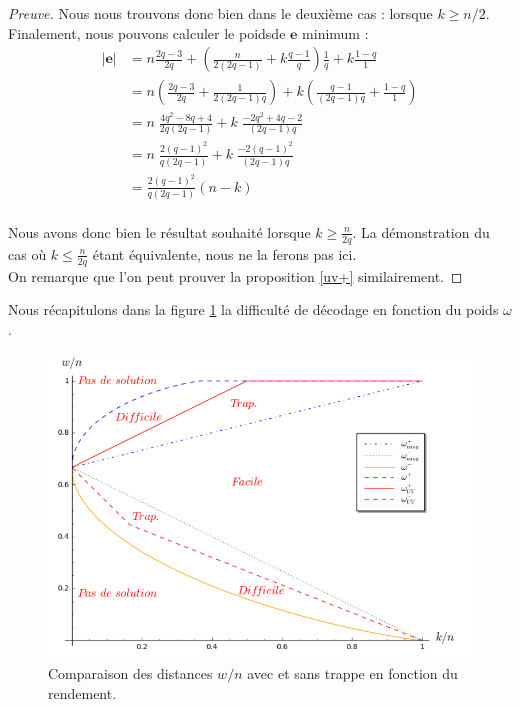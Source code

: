 \documentclass[12pt]{article}
\theoremstyle{plain}
\theoremstyle{definition}
\newcommand{\e}{\mathbf{e}}
\begin{document}
\begin{proof}[Preuve]
Nous nous trouvons donc bien dans le deuxième cas : lorsque $k \geq n/2$. Finalement, nous pouvons calculer le poidsde $\e$ minimum :
\begin{equation*}
\begin{split}
|\e| &= n\frac{2q-3}{2q} + \left(\frac{n}{2(2q-1)} + k\frac{q-1}{q}\right)\frac{1}{q}+ k \frac{1-q}{1}\\[0.6cm]
&= n\left(\frac{2q-3}{2q} + \frac{1}{2(2q-1)q}\right) + k\left(\frac{q-1}{(2q-1)q}+ \frac{1-q}{1}\right)\\[0.6cm]
&= n\;\frac{4q^2-8q+4}{2q(2q-1)} + k\;\frac{-2q^2+4q-2}{(2q-1)q}\\[0.6cm]
&= n\;\frac{2(q-1)^2}{q(2q-1)} + k\;\frac{-2(q-1)^2}{(2q-1)q}\\[0.6cm]
&= \frac{2(q-1)^2}{q(2q-1)}(n-k)\\[0.6cm]
\end{split}
\end{equation*}

\noindent Nous avons donc bien le résultat souhaité lorsque $ k \geq \frac{n}{2q}$. La démonstration du cas où $k \leq \frac{n}{2q}$ étant équivalente, nous ne la ferons pas ici.\\

\noindent On remarque que l'on peut prouver la proposition \ref{uv+} similairement.

\end{proof}

\noindent Nous récapitulons dans la figure \ref{graphique ratio} la difficulté de décodage en fonction du poids $\omega$. \\

\begin{figure}[h]
\begin{center}
\includegraphics [scale=0.4]{include/graph_ratio_w.png}
\end{center}
\caption{\small Comparaison des distances $w/n$ avec et sans trappe en fonction du rendement.}
\label{graphique ratio}
\end{figure}
\end{document}
